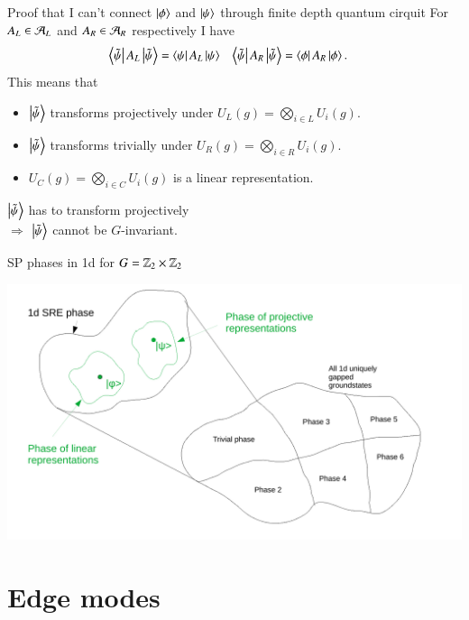 \documentclass{beamer}
\begin{document}
\begin{frame}{Proof that I can't connect $\ket{\phi}$ and $\ket{\psi}$ through finite depth quantum cirquit}
	For $A_L\in\AA_L$ and $A_R\in\AA_R$ respectively I have
	\begin{align}
		\bra{\tilde\psi}A_L\ket{\tilde{\psi}}&=\bra{\psi}A_L\ket{\psi}&\bra{\tilde\psi}A_R\ket{\tilde{\psi}}&=\bra{\phi}A_R\ket{\phi}.
	\end{align}
	\pause
	This means that
	\begin{itemize}
		\item $\ket{\tilde{\psi}}$ transforms projectively under $U_L(g)=\bigotimes_{i \in L}U_i(g)$.
		\item $\ket{\tilde{\psi}}$ transforms trivially under $U_R(g)=\bigotimes_{i \in R}U_i(g)$.
		\item <3->$U_C(g)=\bigotimes_{i\in C}U_i(g)$ is a linear representation.
	\end{itemize}
	\pause
	\pause
	$\ket{\tilde{\psi}}$ has to transform projectively\\
	\pause
	$\Rightarrow$ $\ket{\tilde{\psi}}$ cannot be $G$-invariant.
\end{frame}

\begin{frame}{SP phases in 1d for $G=\ZZ_2\times \ZZ_2$}
	\begin{center}
		\includegraphics[width=\linewidth]{Figures/SPT_Phases_1d.pdf}
	\end{center}
\end{frame}

\section{Edge modes}
\end{document}
